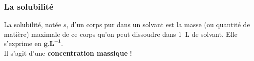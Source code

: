 

\subsubsection{La solubilité}
\begin{tcolorbox}[colback=green!5!white,colframe=green!75!black,title=\textbf{Définition de la solubilité}]
La solubilité, notée $s$, d'un corps pur dans un solvant est la masse (ou quantité de matière) maximale de ce corps qu'on peut dissoudre dans $1$~L de solvant. Elle s'exprime en $\mathbf{g.L^{-1}}$.\\
Il s'agit d'une \textbf{concentration massique} !
\end{tcolorbox}
